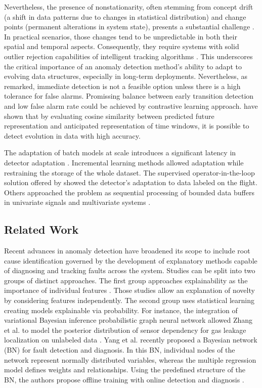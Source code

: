 Nevertheless, the presence of nonstationarity, often stemming from concept drift (a shift in data patterns due to changes in statistical distribution) and change points (permanent alterations in system state), presents a substantial challenge \citep{Salehi2018}. In practical scenarios, those changes tend to be unpredictable in both their spatial and temporal aspects. Consequently, they require systems with solid outlier rejection capabilities of intelligent tracking algorithms \citep{Barbosa2019162}. This underscores the critical importance of an anomaly detection method's ability to adapt to evolving data structures, especially in long-term deployments. Nevertheless, as \citep{Tartakovsky2013} remarked, immediate detection is not a feasible option unless there is a high tolerance for false alarms. Promissing balance between early transition detection and low false alarm rate could be achieved by contrastive learning approach. \citet{Deldari2021} have shown that by evaluating cosine similarity between predicted future representation and anticipated representation of time windows, it is possible to detect evolution in data with high accuracy.

The adaptation of batch models at scale introduces a significant latency in detector adaptation \citep{Wu2021}. Incremental learning methods allowed adaptation while restraining the storage of the whole dataset. The supervised operator-in-the-loop solution offered by \citet{Pannu2012} showed the detector's adaptation to data labeled on the flight.
Others approached the problem as sequential processing of bounded data buffers in univariate signals \citep{Ahmad2017134} and multivariate systems \citep{Bosman201514}.

\subsection{Related Work}
Recent advances in anomaly detection have broadened its scope to include root cause identification governed by the development of explanatory methods capable of diagnosing and tracking faults across the system. Studies can be split into two groups of distinct approaches. The first group approaches explainability as the importance of individual features \citep{Carletti2019, Nguyen2019, Amarasinghe2018}. Those studies allow an explanation of novelty by considering features independently. The second group uses statistical learning creating models explainable via probability. For instance, the integration of variational Bayesian inference probabilistic graph neural network allowed Zhang et al. to model the posterior distribution of sensor dependency for gas leakage localization on unlabeled data \citep{ZHANG2023120542}. Yang et al. recently proposed a Bayesian network (BN) for fault detection and diagnosis. In this BN, individual nodes of the network represent normally distributed variables, whereas the multiple regression model defines weights and relationships. Using the predefined structure of the BN, the authors propose offline training with online detection and diagnosis \citep{Yang2022}.

